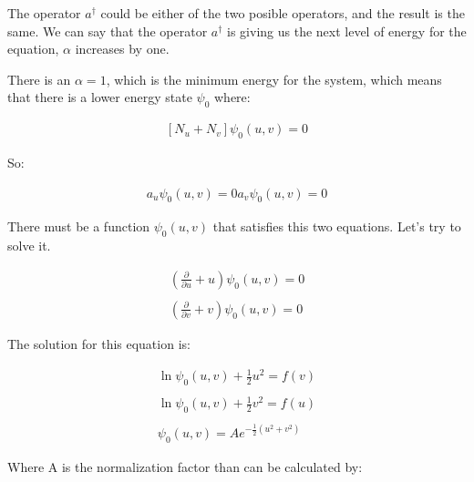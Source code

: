 The operator $a^{\dagger}$ could be either of the two posible operators, and the result is the same. We can say that the operator $a^{\dagger}$ is giving us the next level of energy for the equation, $\alpha$ increases by one.

There is an $\alpha = 1$, which is the minimum energy for the system, which means that there is a lower energy state $\psi_0$ where:

\begin{equation}
  \begin{array}{c}
    \left[N_u+N_v\right] \psi_0(u,v) = 0
  \end{array}
\end{equation}

So:

\begin{equation}
  \begin{array}{c}
    a_u \psi_0(u,v) = 0
    a_v \psi_0(u,v) = 0
  \end{array}
\end{equation}

There must be a function $\psi_0(u,v)$ that satisfies this two equations. Let's try to solve it.

\begin{equation}
  \begin{array}{c}
    \left(\frac{\partial}{\partial u} + u\right)\psi_0(u,v) = 0
    \\

    \\
    \left(\frac{\partial}{\partial v} + v\right)\psi_0(u,v) = 0
  \end{array}
\end{equation}

The solution for this equation is:

\begin{equation}
  \begin{array}{c}
    \ln\psi_0(u,v) + \frac{1}{2}u^2 = f(v)
    \\

    \\
    \ln\psi_0(u,v) + \frac{1}{2}v^2 = f(u)
    \\

    \\
    \psi_0(u,v) = A e^{-\frac{1}{2}(u^2+v^2)}
  \end{array}
\end{equation}

Where A is the normalization factor than can be calculated by:

